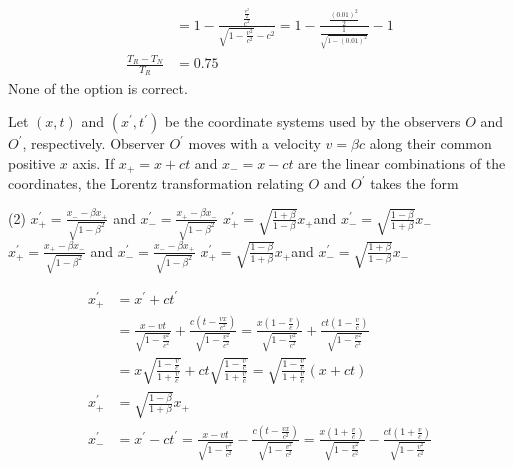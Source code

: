\begin{enumerate}
\begin{answer}
\begin{align*}
	&=1-\frac{\frac{\frac{v^{2}}{2}}{c^{2}}}{\sqrt{1-\frac{v^{2}}{c^{2}}}-c^{2}}=1-\frac{\frac{(0.01)^{2}}{2}}{\frac{1}{\sqrt{1-(0.01)^{2}}}}-1\\
	\frac{T_{R}-T_{N}}{T_{R}}&=0.75
	\end{align*}
	None of the option is correct.
\end{answer}
\begin{minipage}{\textwidth}
	\item Let $(x, t)$ and $\left(x^{\prime}, t^{\prime}\right)$ be the coordinate systems used by the observers $O$ and $O^{\prime}$, respectively. Observer $O^{\prime}$ moves with a velocity $v=\beta c$ along their common positive $x$ axis. If $x_{+}=x+c t$ and $x_{-}=x-c t$ are the linear combinations of the coordinates, the Lorentz transformation relating $O$ and $O^{\prime}$ takes the form
\end{minipage}
\begin{tasks}(2)
	\task[\textbf{A.}] $x_{+}^{\prime}=\frac{x_{-}-\beta x_{+}}{\sqrt{1-\beta^{2}}}$ and $x_{-}^{\prime}=\frac{x_{+}-\beta x_{-}}{\sqrt{1-\beta^{2}}}$
	\task[\textbf{B.}]$x_{+}^{\prime}=\sqrt{\frac{1+\beta}{1-\beta}} x_{+}$and $x_{-}^{\prime}=\sqrt{\frac{1-\beta}{1+\beta}} x_{-}$
	\task[\textbf{C.}]$x_{+}^{\prime}=\frac{x_{+}-\beta x_{-}}{\sqrt{1-\beta^{2}}}$ and $x_{-}^{\prime}=\frac{x_{-}-\beta x_{+}}{\sqrt{1-\beta^{2}}}$
	\task[\textbf{D.}]$x_{+}^{\prime}=\sqrt{\frac{1-\beta}{1+\beta}} x_{+}$and $x_{-}^{\prime}=\sqrt{\frac{1+\beta}{1-\beta}} x_{-}$
\end{tasks}
\begin{answer}
\begin{align*}
x_{+}^{\prime}&=x^{\prime}+c t^{\prime}\\
&=\frac{x-v t}{\sqrt{1-\frac{v^{2}}{c^{2}}}}+\frac{c\left(t-\frac{v x}{c^{2}}\right)}{\sqrt{1-\frac{v^{2}}{c^{2}}}}=\frac{x\left(1-\frac{v}{c}\right)}{\sqrt{1-\frac{v^{2}}{c^{2}}}}+\frac{c t\left(1-\frac{v}{c}\right)}{\sqrt{1-\frac{v^{2}}{c^{2}}}}\\
&=x \sqrt{\frac{1-\frac{v}{c}}{1+\frac{v}{c}}}+c t \sqrt{\frac{1-\frac{v}{c}}{1+\frac{v}{c}}}=\sqrt{\frac{1-\frac{v}{c}}{1+\frac{v}{c}}}(x+c t)\\
x_{+}^{\prime}&=\sqrt{\frac{1-\beta}{1+\beta}} x_{+}\\
x_{-}^{\prime}&=x^{\prime}-c t^{\prime}=\frac{x-v t}{\sqrt{1-\frac{v^{2}}{c^{2}}}}-\frac{c\left(t-\frac{v x}{c^{2}}\right)}{\sqrt{1-\frac{v^{2}}{c^{2}}}}=\frac{x\left(1+\frac{v}{c}\right)}{\sqrt{1-\frac{v^{2}}{c^{2}}}}-\frac{c t\left(1+\frac{v}{c}\right)}{\sqrt{1-\frac{v^{2}}{c^{2}}}}\\

\end{align*}
\end{answer}
\end{enumerate}
